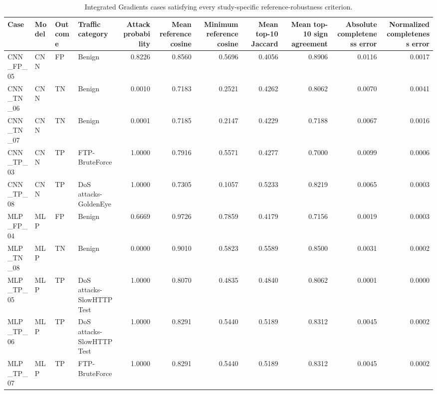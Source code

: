\begin{table}
\caption{Integrated Gradients cases satisfying every study-specific reference-robustness criterion.}
\label{tab:ig_reference_robust_cases}
\begin{tabular}{llllrrrrrrr}
\toprule
Case & Model & Outcome & Traffic category & Attack probability & Mean reference cosine & Minimum reference cosine & Mean top-10 Jaccard & Mean top-10 sign agreement & Absolute completeness error & Normalized completeness error \\
\midrule
CNN\_FP\_05 & CNN & FP & Benign & 0.8226 & 0.8560 & 0.5696 & 0.4056 & 0.8906 & 0.0116 & 0.0017 \\
CNN\_TN\_06 & CNN & TN & Benign & 0.0010 & 0.7183 & 0.2521 & 0.4262 & 0.8062 & 0.0070 & 0.0041 \\
CNN\_TN\_07 & CNN & TN & Benign & 0.0001 & 0.7185 & 0.2147 & 0.4229 & 0.7188 & 0.0067 & 0.0016 \\
CNN\_TP\_03 & CNN & TP & FTP-BruteForce & 1.0000 & 0.7916 & 0.5571 & 0.4277 & 0.7000 & 0.0099 & 0.0006 \\
CNN\_TP\_08 & CNN & TP & DoS attacks-GoldenEye & 1.0000 & 0.7305 & 0.1057 & 0.5233 & 0.8219 & 0.0065 & 0.0003 \\
MLP\_FP\_04 & MLP & FP & Benign & 0.6669 & 0.9726 & 0.7859 & 0.4179 & 0.7156 & 0.0019 & 0.0003 \\
MLP\_TN\_08 & MLP & TN & Benign & 0.0000 & 0.9010 & 0.5823 & 0.5589 & 0.8500 & 0.0031 & 0.0002 \\
MLP\_TP\_05 & MLP & TP & DoS attacks-SlowHTTPTest & 1.0000 & 0.8070 & 0.4835 & 0.4840 & 0.8062 & 0.0001 & 0.0000 \\
MLP\_TP\_06 & MLP & TP & DoS attacks-SlowHTTPTest & 1.0000 & 0.8291 & 0.5440 & 0.5189 & 0.8312 & 0.0045 & 0.0002 \\
MLP\_TP\_07 & MLP & TP & FTP-BruteForce & 1.0000 & 0.8291 & 0.5440 & 0.5189 & 0.8312 & 0.0045 & 0.0002 \\
\bottomrule
\end{tabular}
\end{table}
